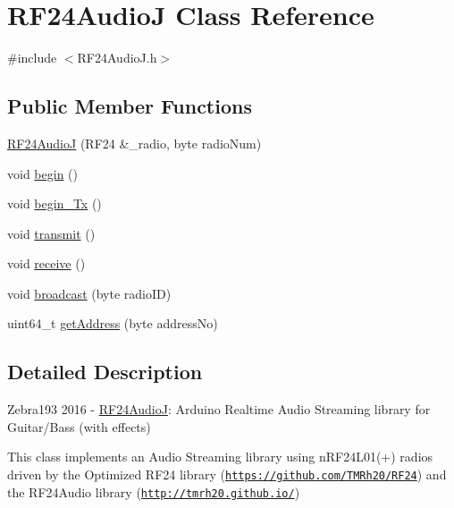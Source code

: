 \hypertarget{class_r_f24_audio_j}{\section{R\-F24\-Audio\-J Class Reference}
\label{class_r_f24_audio_j}
}


{\ttfamily \#include $<$R\-F24\-Audio\-J.\-h$>$}

\subsection*{Public Member Functions}
\begin{DoxyCompactItemize}
\item 
\hyperlink{class_r_f24_audio_j_a1ed1125e94cb69872354e199e80090e1}{R\-F24\-Audio\-J} (R\-F24 \&\-\_\-radio, byte radio\-Num)
\item 
void \hyperlink{class_r_f24_audio_j_acc4156e3a67749615cca1c677f4fc066}{begin} ()
\item 
void \hyperlink{class_r_f24_audio_j_ac6cd17ac424f50eee04fc7ecfad37397}{begin\-\_\-\-Tx} ()
\item 
void \hyperlink{class_r_f24_audio_j_a7e1bf5acb392ab6533d99e2448bf5470}{transmit} ()
\item 
void \hyperlink{class_r_f24_audio_j_a0ea9b2d7302cd34bfe9706d7bbdf253b}{receive} ()
\item 
void \hyperlink{class_r_f24_audio_j_a0cf7d5be639198244f43b049ad06e455}{broadcast} (byte radio\-I\-D)
\item 
uint64\-\_\-t \hyperlink{class_r_f24_audio_j_a6d21f5bdef8931a1fdef2187c08da19a}{get\-Address} (byte address\-No)
\end{DoxyCompactItemize}


\subsection{Detailed Description}
Zebra193 2016 -\/ \hyperlink{class_r_f24_audio_j}{R\-F24\-Audio\-J}\-: Arduino Realtime Audio Streaming library for Guitar/\-Bass (with effects)

This class implements an Audio Streaming library using n\-R\-F24\-L01(+) radios driven by the Optimized R\-F24 library (\href{https://github.com/TMRh20/RF24}{\tt https\-://github.\-com/\-T\-M\-Rh20/\-R\-F24}) and the R\-F24\-Audio library (\href{http://tmrh20.github.io/}{\tt http\-://tmrh20.\-github.\-io/}) 

